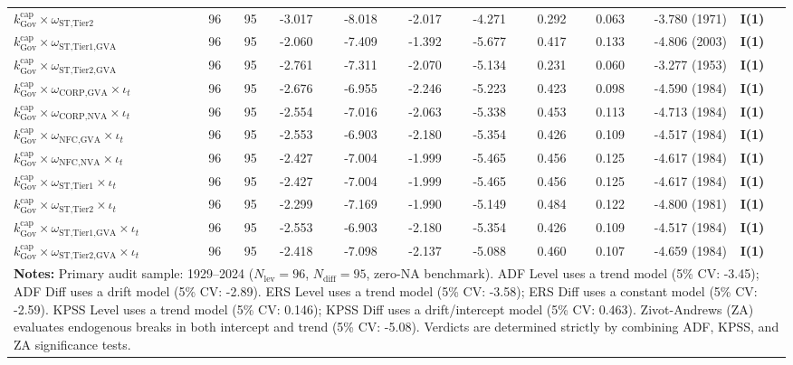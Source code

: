 \documentclass[11pt,a4paper]{article}
\begin{document}
\begin{landscape}
\begin{table}[h!]
\begin{tabular}{p{6.0cm} p{0.6cm} p{0.6cm} p{1.5cm} p{1.5cm} p{1.5cm} p{1.5cm} p{1.5cm} p{1.5cm} p{2.2cm} p{2.2cm}}
$k^{\text{cap}}_{\text{Gov}} \times \omega_{\text{ST,Tier2}}$ & 96 & 95 & -3.017 & -8.018 & -2.017 & -4.271 & 0.292 & 0.063 & -3.780 (1971) & \textbf{I(1)} \\
$k^{\text{cap}}_{\text{Gov}} \times \omega_{\text{ST,Tier1,GVA}}$ & 96 & 95 & -2.060 & -7.409 & -1.392 & -5.677 & 0.417 & 0.133 & -4.806 (2003) & \textbf{I(1)} \\
$k^{\text{cap}}_{\text{Gov}} \times \omega_{\text{ST,Tier2,GVA}}$ & 96 & 95 & -2.761 & -7.311 & -2.070 & -5.134 & 0.231 & 0.060 & -3.277 (1953) & \textbf{I(1)} \\
$k^{\text{cap}}_{\text{Gov}} \times \omega_{\text{CORP,GVA}} \times \iota_t$ & 96 & 95 & -2.676 & -6.955 & -2.246 & -5.223 & 0.423 & 0.098 & -4.590 (1984) & \textbf{I(1)} \\
$k^{\text{cap}}_{\text{Gov}} \times \omega_{\text{CORP,NVA}} \times \iota_t$ & 96 & 95 & -2.554 & -7.016 & -2.063 & -5.338 & 0.453 & 0.113 & -4.713 (1984) & \textbf{I(1)} \\
$k^{\text{cap}}_{\text{Gov}} \times \omega_{\text{NFC,GVA}} \times \iota_t$ & 96 & 95 & -2.553 & -6.903 & -2.180 & -5.354 & 0.426 & 0.109 & -4.517 (1984) & \textbf{I(1)} \\
$k^{\text{cap}}_{\text{Gov}} \times \omega_{\text{NFC,NVA}} \times \iota_t$ & 96 & 95 & -2.427 & -7.004 & -1.999 & -5.465 & 0.456 & 0.125 & -4.617 (1984) & \textbf{I(1)} \\
$k^{\text{cap}}_{\text{Gov}} \times \omega_{\text{ST,Tier1}} \times \iota_t$ & 96 & 95 & -2.427 & -7.004 & -1.999 & -5.465 & 0.456 & 0.125 & -4.617 (1984) & \textbf{I(1)} \\
$k^{\text{cap}}_{\text{Gov}} \times \omega_{\text{ST,Tier2}} \times \iota_t$ & 96 & 95 & -2.299 & -7.169 & -1.990 & -5.149 & 0.484 & 0.122 & -4.800 (1981) & \textbf{I(1)} \\
$k^{\text{cap}}_{\text{Gov}} \times \omega_{\text{ST,Tier1,GVA}} \times \iota_t$ & 96 & 95 & -2.553 & -6.903 & -2.180 & -5.354 & 0.426 & 0.109 & -4.517 (1984) & \textbf{I(1)} \\
$k^{\text{cap}}_{\text{Gov}} \times \omega_{\text{ST,Tier2,GVA}} \times \iota_t$ & 96 & 95 & -2.418 & -7.098 & -2.137 & -5.088 & 0.460 & 0.107 & -4.659 (1984) & \textbf{I(1)} \\
\bottomrule
\multicolumn{11}{p{23.0cm}}{\footnotesize \textbf{Notes:} Primary audit sample: 1929--2024 ($N_{\text{lev}}=96$, $N_{\text{diff}}=95$, zero-NA benchmark). ADF Level uses a trend model (5\% CV: -3.45); ADF Diff uses a drift model (5\% CV: -2.89). ERS Level uses a trend model (5\% CV: -3.58); ERS Diff uses a constant model (5\% CV: -2.59). KPSS Level uses a trend model (5\% CV: 0.146); KPSS Diff uses a drift/intercept model (5\% CV: 0.463). Zivot-Andrews (ZA) evaluates endogenous breaks in both intercept and trend (5\% CV: -5.08). Verdicts are determined strictly by combining ADF, KPSS, and ZA significance tests.}
\end{tabular}
\end{table}
\end{landscape}
\end{document}
